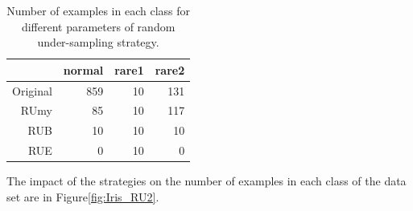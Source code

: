 \documentclass[10pt,a4paper]{article}\usepackage[]{graphicx}\usepackage[]{color}
\begin{document}
\begin{table}[ht]
\centering
\begin{tabular}{rrrr}
  \hline
 & normal & rare1 & rare2 \\ 
  \hline
Original & 859 &  10 & 131 \\ 
  RUmy &  85 &  10 & 117 \\ 
  RUB &  10 &  10 &  10 \\ 
  RUE &   0 &  10 &   0 \\ 
   \hline
\end{tabular}
\caption{Number of examples in each class for different parameters of random under-sampling strategy.} 
\label{tab:RU_tab}
\end{table}


The impact of the strategies on the number of examples in each class of the data set are in Figure\ref{fig:Iris_RU2}.
\end{document}
